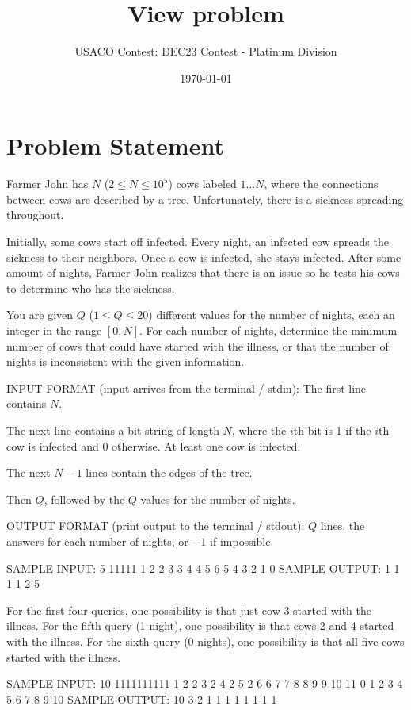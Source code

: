 \documentclass[12pt]{article}
\title{View problem}
\author{USACO Contest: DEC23 Contest - Platinum Division}
\date{\today}
\begin{document}
\maketitle

\section*{Problem Statement}


Farmer John has $N$ ($2\le N\le 10^5$) cows labeled $1\dots N$, where the 
connections between cows are described by a tree. Unfortunately, there is a
sickness spreading throughout. 

Initially, some cows start off infected. Every night, an infected cow spreads
the sickness to their neighbors. Once a cow is infected, she stays infected.
After some amount of nights, Farmer John realizes that there is an issue so he
tests his cows to determine who has the sickness.  

You are given $Q$ ($1\le Q\le 20$) different values for the number of nights, 
each an integer in the range $[0,N]$.  For each number of nights, determine the
minimum number of cows that could have  started with the illness, or that the
number of nights is inconsistent with the given information.

INPUT FORMAT (input arrives from the terminal / stdin):
The first line contains $N$.

The next line contains a bit string of length $N$, where the $i$th bit is 1  if
the $i$th cow is infected and 0 otherwise. At least one cow is infected.

The next $N-1$ lines contain the edges of the tree.

Then $Q$, followed by the $Q$ values for the number of nights.

OUTPUT FORMAT (print output to the terminal / stdout):
$Q$ lines, the answers for each number of nights, or $-1$ if impossible.

SAMPLE INPUT:
5
11111
1 2
2 3
3 4
4 5
6
5
4
3
2
1
0
SAMPLE OUTPUT: 
1
1
1
1
2
5

For the first four queries, one possibility is that just cow 3 started with the
illness. For the fifth query (1 night), one possibility is that cows 2 and 4
started with the illness. For the sixth query (0 nights), one possibility is
that all five cows started with the illness.

SAMPLE INPUT:
10
1111111111
1 2
2 3
2 4
2 5
2 6
6 7
7 8
8 9
9 10
11
0
1
2
3
4
5
6
7
8
9
10
SAMPLE OUTPUT: 
10
3
2
1
1
1
1
1
1
1
1
\end{document}
